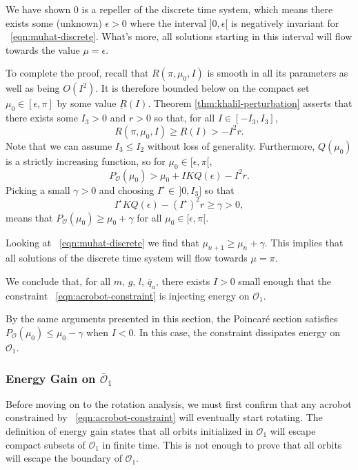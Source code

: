 We have shown \(0\) is a repeller of the discrete time system, which means
there exists some (unknown) \(\epsilon > 0\) where the interval
\(]0,\epsilon[\) is negatively invariant for ~\eqref{eqn:muhat-discrete}.
What's more, all solutions starting in this interval will flow towards the value
\(\mu = \epsilon\).

To complete the proof, recall that \(R(\pi,\mu_0,I)\) is smooth in all its
parameters as well as being \(O(I^2)\).
It is therefore bounded below on the compact set \(\mu_0 \in [\epsilon,\pi]\)
by some value \(\underbar{R}(I)\). 
Theorem \ref{thm:khalil-perturbation} asserts that there exists some
\(I_3 > 0\) and \(r > 0\) so that, for all \(I \in [-I_3, I_3]\),
\[
    R(\pi,\mu_0,I) \geq \underbar{R}(I) > -I^2 r
    .
\]
Note that we can assume \(I_3 \leq I_2\) without loss of generality.
Furthermore, \(Q(\mu_0)\) is a strictly increasing function, so
for \(\mu_0 \in [\epsilon,\pi[\),
\[
    P_\mathcal{O}(\mu_0) > \mu_0 + I K Q(\epsilon) - I^2 r
    .
\]
Picking a small \(\gamma > 0\) and choosing 
\(I^\star \in\, ]0, I_3]\) so that
\[
    I^\star K Q(\epsilon) - (I^\star)^2 r \geq \gamma > 0
    ,
\]
means that \( P_\mathcal{O}(\mu_0) \geq \mu_0 + \gamma\)
for all \(\mu_0 \in [\epsilon,\pi[\).

Looking at ~\eqref{eqn:muhat-discrete} we find that
\(\mu_{n+1} \geq \mu_n + \gamma\). 
This implies that all solutions of the discrete time system will flow towards
\(\mu = \pi\).

We conclude that, for all \(m\), \(g\), \(l\), \(\bar{q}_a\), 
there exists \(I > 0\) small enough that the constraint 
~\eqref{eqn:acrobot-constraint} is injecting energy on \(\mathcal{O}_1\).

By the same arguments presented in this section, the Poincar\'{e} section
satisfies \(P_\mathcal{O}(\mu_0) \leq \mu_0 - \gamma\) when \(I < 0\). 
In this case, the constraint dissipates energy on \(\mathcal{O}_1\).

\subsubsection*{Energy Gain on \(\bar{\mathcal{O}}_1\)}
Before moving on to the rotation analysis, we must first confirm that any
acrobot constrained by ~\eqref{eqn:acrobot-constraint} will eventually start
rotating.
The definition of energy gain states that all orbits initialized in
\(\mathcal{O}_1\) will escape compact subsets of \(\mathcal{O}_1\) in finite time. 
This is not enough to prove that all orbits will escape the boundary of
\(\mathcal{O}_1\). 

